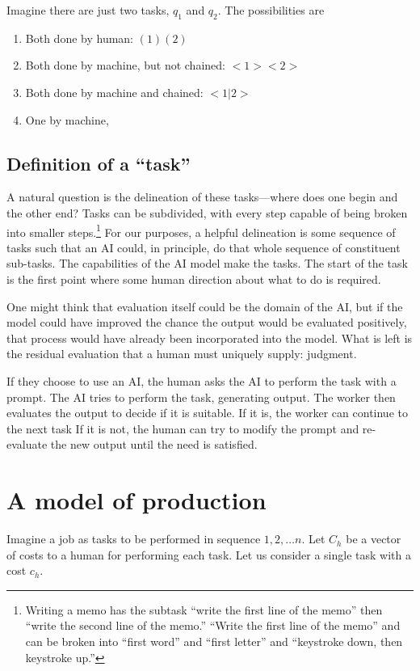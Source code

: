 \documentclass{article}
\begin{document}
Imagine there are just two tasks, $q_1$ and $q_2$.
The possibilities are
\begin{enumerate}
 \item Both done by human: $(1)(2)$
 \item Both done by machine, but not chained: $<1><2>$
  \item Both done by machine and chained: $<1|2>$
  \item One by machine, 


\end{enumerate}

\subsection{Definition of a ``task''}
A natural question is the delineation of these tasks---where does one begin and the other end? 
Tasks can be subdivided, with every step capable of being broken into smaller steps.\footnote{
    Writing a memo has the subtask ``write the first line of the memo'' then ``write the second line of the memo.''
    ``Write the first line of the memo'' and can be broken into ``first word'' and ``first letter'' and ``keystroke down, then keystroke up.''    
}
For our purposes, a helpful delineation is some sequence of tasks such that an AI could, in principle, do that whole sequence of constituent sub-tasks.
The capabilities of the AI model make the tasks. 
The start of the task is the first point where some human direction about what to do is required. 

One might think that evaluation itself could be the domain of the AI, but if the model could have improved the chance the output would be evaluated positively, that process would have already been incorporated into the model. 
What is left is the residual evaluation that a human must uniquely supply: judgment.

If they choose to use an AI, the human asks the AI to perform the task with a prompt. 
The AI tries to perform the task, generating output.
The worker then evaluates the output to decide if it is suitable. 
If it is, the worker can continue to the next task 
If it is not, the human can try to modify the prompt and re-evaluate the new output until the need is satisfied. 

\section{A model of production}
Imagine a job as tasks to be performed in sequence $1, 2, \ldots n$.
Let $C_h$ be a vector of costs to a human for performing each task.
Let us consider a single task with a cost $c_{h}$.
\end{document}
